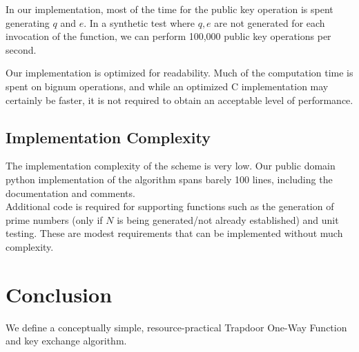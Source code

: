 \documentclass[preprint]{iacrtrans}
\begin{document}
In our implementation, most of the time for the public key operation is spent generating $q$ and $e$. In a synthetic test where $q, e$ are not generated for each invocation of the function, we can perform 100,000 public key operations per second.

Our implementation is optimized for readability. Much of the computation time is spent on bignum operations, and while an optimized C implementation may certainly be faster, it is not required to obtain an acceptable level of performance. 

\subsection{Implementation Complexity}
The implementation complexity of the scheme is very low. Our public domain python implementation of the algorithm spans barely 100 lines, including the documentation and comments.\\

Additional code is required for supporting functions such as the generation of prime numbers (only if $N$ is being generated/not already established) and unit testing. These are modest requirements that can be implemented without much complexity. \\

\section{Conclusion}
We define a conceptually simple, resource-practical Trapdoor One-Way Function and key exchange algorithm. 
\end{document}
